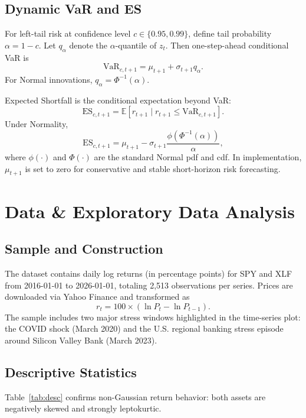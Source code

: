 \documentclass[12pt]{article}
\begin{document}
\subsection{Dynamic VaR and ES}
For left-tail risk at confidence level $c \in \{0.95,0.99\}$, define tail probability $\alpha=1-c$. Let $q_\alpha$ denote the $\alpha$-quantile of $z_t$. Then one-step-ahead conditional VaR is
\begin{equation}
\mathrm{VaR}_{c,t+1}=\mu_{t+1}+\sigma_{t+1}q_\alpha.
\end{equation}
For Normal innovations, $q_\alpha=\Phi^{-1}(\alpha)$.

Expected Shortfall is the conditional expectation beyond VaR:
\begin{equation}
\mathrm{ES}_{c,t+1}=\mathbb{E}\left[r_{t+1}\mid r_{t+1}\le \mathrm{VaR}_{c,t+1}\right].
\end{equation}
Under Normality,
\begin{equation}
\mathrm{ES}_{c,t+1}=\mu_{t+1}-\sigma_{t+1}\frac{\phi\left(\Phi^{-1}(\alpha)\right)}{\alpha},
\end{equation}
where $\phi(\cdot)$ and $\Phi(\cdot)$ are the standard Normal pdf and cdf. In implementation, $\mu_{t+1}$ is set to zero for conservative and stable short-horizon risk forecasting.

\section{Data \& Exploratory Data Analysis}
\subsection{Sample and Construction}
The dataset contains daily log returns (in percentage points) for SPY and XLF from 2016-01-01 to 2026-01-01, totaling 2,513 observations per series. Prices are downloaded via Yahoo Finance and transformed as
\begin{equation}
    r_t = 100\times\left(\ln P_t - \ln P_{t-1}\right).
\end{equation}
The sample includes two major stress windows highlighted in the time-series plot: the COVID shock (March 2020) and the U.S. regional banking stress episode around Silicon Valley Bank (March 2023).

\subsection{Descriptive Statistics}
Table~\ref{tab:desc} confirms non-Gaussian return behavior: both assets are negatively skewed and strongly leptokurtic.
\end{document}
